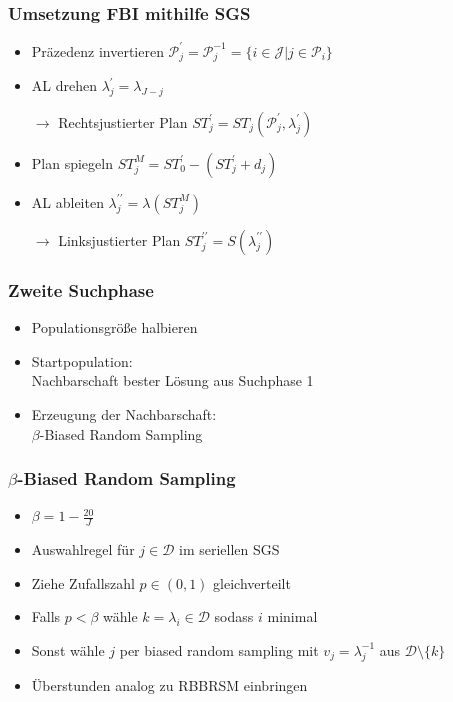 \begin{frame}[noframenumbering]
	\frametitle{Umsetzung FBI mithilfe SGS}
	\begin{itemize}
		\item Präzedenz invertieren $\mathcal{P}_j^\prime = \mathcal{P}_j^{-1} = \{ i \in \mathcal{J} | j \in \mathcal{P}_i \}$
		\item AL drehen $\lambda_j^\prime = \lambda_{J-j}$
		\item[$\rightarrow$] Rechtsjustierter Plan $ST_j^\prime= ST_j(\mathcal{P}_j^\prime, \lambda_j^\prime)$\\[8mm]
		\item Plan spiegeln $ST_j^M = ST_0^\prime - (ST_j^\prime + d_j)$
		\item AL ableiten $\lambda_j^{\prime\prime} = \lambda(ST_j^M)$
		\item[$\rightarrow$] Linksjustierter Plan $ST_j^{\prime\prime} = S(\lambda_j^{\prime\prime})$
	\end{itemize}
\end{frame}

\begin{frame}[noframenumbering]
	\frametitle{Zweite Suchphase}
	\begin{itemize}
		\item Populationsgröße halbieren\\[4mm]
		\item Startpopulation:\\Nachbarschaft bester Lösung aus Suchphase 1\\[4mm]
		\item Erzeugung der Nachbarschaft:\\$\beta$-Biased Random Sampling
	\end{itemize}
\end{frame}

\begin{frame}[noframenumbering]
	\frametitle{$\beta$-Biased Random Sampling}
	\begin{itemize}
		\item $\beta=1-\frac{20}{J}$
		\item Auswahlregel für $j \in \mathcal{D}$ im seriellen SGS
		\item Ziehe Zufallszahl $p \in (0,1)$ gleichverteilt
		\item Falls $p < \beta$ wähle $k = \lambda_i \in \mathcal{D}$ sodass $i$ minimal
		\item Sonst wähle $j$ per biased random sampling mit $v_j=\lambda_j^{-1}$ aus $\mathcal{D} \setminus \{ k\}$
		\item Überstunden analog zu RBBRSM einbringen
	\end{itemize}
\end{frame}

